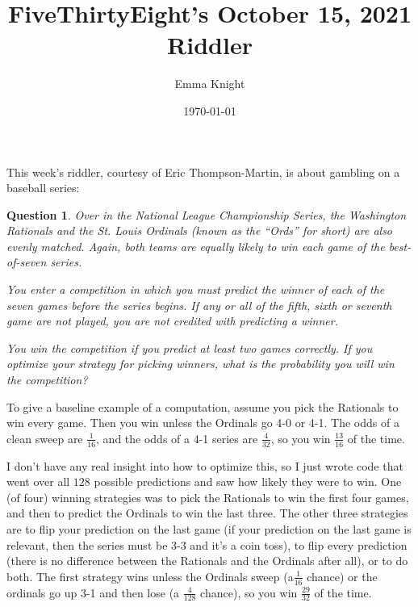 \documentclass[11pt]{article}
\title{FiveThirtyEight's October 15, 2021 Riddler}
\author{Emma Knight}
\date{\today}
\newtheorem{question}[theorem]{Question}
\theoremstyle{definition}
\begin{document}
\maketitle
This week's riddler, courtesy of Eric Thompson-Martin, is about gambling on a baseball series:
\begin{question}
Over in the National League Championship Series, the Washington Rationals and the St. Louis Ordinals (known as the ``Ords'' for short) are also evenly matched. Again, both teams are equally likely to win each game of the best-of-seven series.

You enter a competition in which you must predict the winner of each of the seven games before the series begins. If any or all of the fifth, sixth or seventh game are not played, you are not credited with predicting a winner.

You win the competition if you predict at least two games correctly. If you optimize your strategy for picking winners, what is the probability you will win the competition?
\end{question}
To give a baseline example of a computation, assume you pick the Rationals to win every game.  Then you win unless the Ordinals go 4-0 or 4-1.  The odds of a clean sweep are $\frac{1}{16}$, and the odds of a 4-1 series are $\frac{4}{32}$, so you win $\frac{13}{16}$ of the time.

I don't have any real insight into how to optimize this, so I just wrote code that went over all $128$ possible predictions and saw how likely they were to win.  One (of four) winning strategies was to pick the Rationals to win the first four games, and then to predict the Ordinals to win the last three.  The other three strategies are to flip your prediction on the last game (if your prediction on the last game is relevant, then the series must be 3-3 and it's a coin toss), to flip every prediction (there is no difference between the Rationals and the Ordinals after all), or to do both.  The first strategy wins unless the Ordinals sweep (a$\frac{1}{16}$ chance) or the ordinals go up 3-1 and then lose (a $\frac{4}{128}$ chance), so you win $\frac{29}{32}$ of the time.
\end{document}
